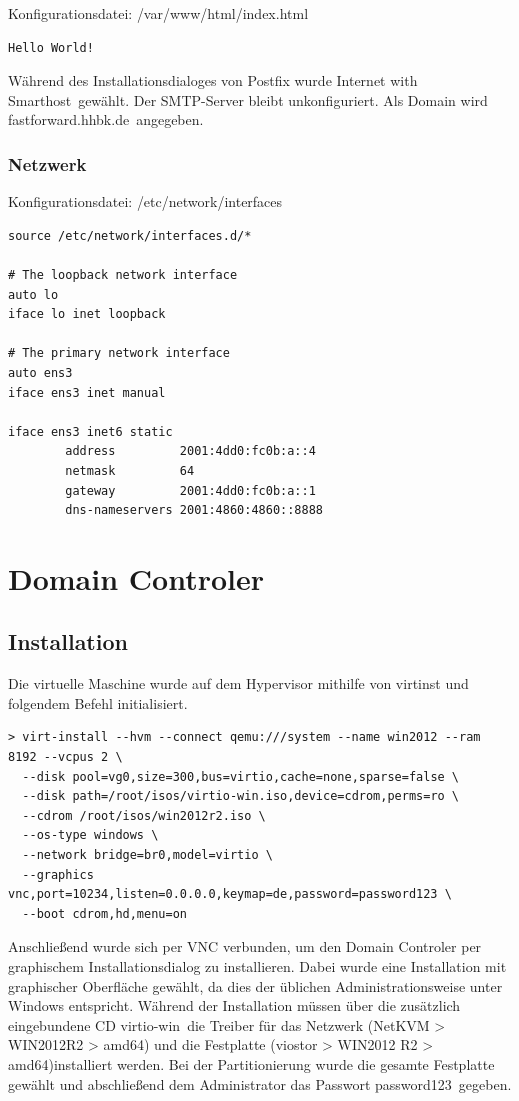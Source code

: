 Konfigurationsdatei: {\sc /var/www/html/index.html}
\begin{lstlisting}
Hello World!
\end{lstlisting}

Während des Installationsdialoges von Postfix wurde \ql Internet with Smarthost\qr\ gewählt. Der SMTP-Server bleibt unkonfiguriert. Als Domain wird \ql fastforward.hhbk.de\qr\ angegeben.

\subsubsection{Netzwerk}

Konfigurationsdatei: {\sc /etc/network/interfaces}
\begin{lstlisting}
source /etc/network/interfaces.d/*

# The loopback network interface
auto lo
iface lo inet loopback

# The primary network interface
auto ens3
iface ens3 inet manual

iface ens3 inet6 static
        address			2001:4dd0:fc0b:a::4
        netmask			64
        gateway			2001:4dd0:fc0b:a::1
        dns-nameservers	2001:4860:4860::8888
\end{lstlisting}

\section{Domain Controler}

\subsection{Installation}

Die virtuelle Maschine wurde auf dem Hypervisor mithilfe von {\sc virtinst} und folgendem Befehl initialisiert.

\begin{lstlisting}[numbers=none]
> virt-install --hvm --connect qemu:///system --name win2012 --ram 8192 --vcpus 2 \
  --disk pool=vg0,size=300,bus=virtio,cache=none,sparse=false \
  --disk path=/root/isos/virtio-win.iso,device=cdrom,perms=ro \
  --cdrom /root/isos/win2012r2.iso \
  --os-type windows \
  --network bridge=br0,model=virtio \
  --graphics vnc,port=10234,listen=0.0.0.0,keymap=de,password=password123 \
  --boot cdrom,hd,menu=on
\end{lstlisting}

Anschließend wurde sich per VNC verbunden, um den Domain Controler per graphischem Installationsdialog zu installieren. Dabei wurde eine Installation mit graphischer Oberfläche gewählt, da dies der üblichen Administrationsweise unter Windows entspricht. Während der Installation müssen über die zusätzlich eingebundene CD \ql virtio-win\qr\ die Treiber für das Netzwerk ({\sc NetKVM > WIN2012R2 > amd64}) und die Festplatte ({\sc viostor > WIN2012	R2 > amd64})installiert werden. Bei der Partitionierung wurde die gesamte Festplatte gewählt und abschließend dem Administrator das Passwort \ql password123\qr\ gegeben.

